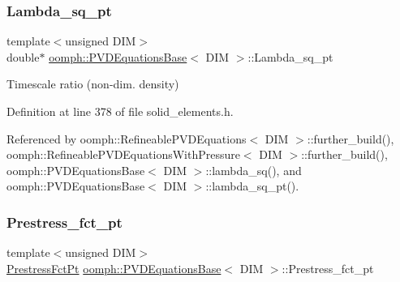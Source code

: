 \mbox{\label{classoomph_1_1PVDEquationsBase_aeba8ca692b3ea3b8624f3dcc4ab874b7}} 
\subsubsection{\texorpdfstring{Lambda\+\_\+sq\+\_\+pt}{Lambda\_sq\_pt}}
{\footnotesize\ttfamily template$<$unsigned D\+IM$>$ \\
double$\ast$ \hyperlink{classoomph_1_1PVDEquationsBase}{oomph\+::\+P\+V\+D\+Equations\+Base}$<$ D\+IM $>$\+::Lambda\+\_\+sq\+\_\+pt\hspace{0.3cm}{\ttfamily [protected]}}



Timescale ratio (non-\/dim. density) 



Definition at line 378 of file solid\+\_\+elements.\+h.



Referenced by oomph\+::\+Refineable\+P\+V\+D\+Equations$<$ D\+I\+M $>$\+::further\+\_\+build(), oomph\+::\+Refineable\+P\+V\+D\+Equations\+With\+Pressure$<$ D\+I\+M $>$\+::further\+\_\+build(), oomph\+::\+P\+V\+D\+Equations\+Base$<$ D\+I\+M $>$\+::lambda\+\_\+sq(), and oomph\+::\+P\+V\+D\+Equations\+Base$<$ D\+I\+M $>$\+::lambda\+\_\+sq\+\_\+pt().

\mbox{\label{classoomph_1_1PVDEquationsBase_ab3093822672a836a47f5a538dc25b2e8}} 
\subsubsection{\texorpdfstring{Prestress\+\_\+fct\+\_\+pt}{Prestress\_fct\_pt}}
{\footnotesize\ttfamily template$<$unsigned D\+IM$>$ \\
\hyperlink{classoomph_1_1PVDEquationsBase_a457b9ffb2b62ecc0cf5fe61cf28e98e5}{Prestress\+Fct\+Pt} \hyperlink{classoomph_1_1PVDEquationsBase}{oomph\+::\+P\+V\+D\+Equations\+Base}$<$ D\+IM $>$\+::Prestress\+\_\+fct\+\_\+pt\hspace{0.3cm}{\ttfamily [protected]}}



